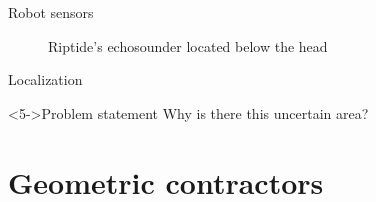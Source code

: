 \documentclass[10pt, xcolor={usenames, dvipsnames}]{beamer}
\begin{document}
\begin{frame}{Robot sensors}
\begin{minipage}[t]{.42\textwidth}
\begin{figure}[htb]
                    \caption{Riptide's echosounder located below the head}
                \end{figure}
            \end{minipage}
        \end{frame}

        \begin{frame}{Localization}
            \begin{minipage}[t]{.45\textwidth}
                \vspace{-4mm}
                \centering
                \begin{figure}
                    \begin{overprint}
                        \centerline{}
                        \centerline{}
                        \centerline{}
                    \end{overprint}
                    \caption{}
               \end{figure}
            \end{minipage}%
            \hfill
            \begin{minipage}[t]{.55\textwidth}
                \centering
                \vspace{-5mm}
                \begin{alertblock}<5->{Problem statement}
                    Why is there this uncertain area?
                \end{alertblock}
            \end{minipage}
        \end{frame}

    \section{Geometric contractors}
\end{document}

